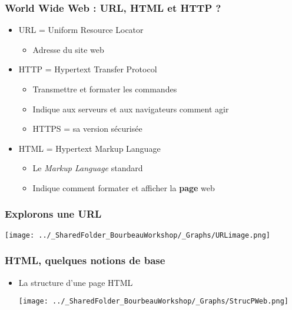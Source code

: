 \documentclass{beamer}
\begin{document}
      \begin{frame}
        \frametitle{World Wide Web : URL, HTML et HTTP ?}
        \begin{itemize}
          \item<2-> URL  = Uniform Resource Locator
            \begin{itemize}
              \item Adresse du site web
            \end{itemize}
          \item<3-> HTTP = Hypertext Transfer Protocol
            \begin{itemize}
              \item Transmettre et formater les commandes
              \item Indique aux serveurs et aux navigateurs comment agir
              \item HTTPS = sa version sécurisée
            \end{itemize}
          \item<4-> HTML = Hypertext Markup Language
            \begin{itemize}
              \item Le \textit{Markup Language} standard
              \item Indique comment formater et afficher la \textbf{page} web
            \end{itemize}
        \end{itemize}
      \end{frame}
      
      \begin{frame}
        \frametitle{Explorons une URL}
          \begin{center}
            \texttt{[image: ../\_SharedFolder\_BourbeauWorkshop/\_Graphs/URLimage.png]}
          \end{center}
      \end{frame}
      
      \begin{frame}
        \frametitle{HTML, quelques notions de base}
        \begin{itemize}
          \item<2-> La structure d'une page HTML
            \begin{center}
            \texttt{[image: ../\_SharedFolder\_BourbeauWorkshop/\_Graphs/StrucPWeb.png]}
            \end{center}
        \end{itemize}
      \end{frame}
      
\end{document}
